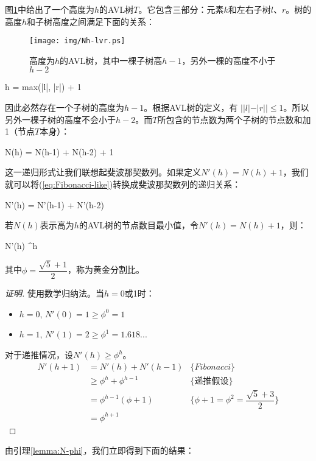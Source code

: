 \documentclass[b5paper]{ctexart}
\begin{document}
图\ref{fig:N-h-relation}中给出了一个高度为$h$的AVL树$T$。它包含三部分：元素$k$和左右子树$l$、$r$。树的高度$h$和子树高度之间满足下面的关系：

\begin{figure}[htbp]
   \centering
   \texttt{[image: img/Nh-lvr.ps]}
   \caption{高度为$h$的AVL树，其中一棵子树高$h - 1$，另外一棵的高度不小于$h - 2$}
   \label{fig:N-h-relation}
\end{figure}

\be
  h = max(|l|, |r|) + 1
\ee

因此必然存在一个子树的高度为$h - 1$。根据AVL树的定义，有 $||l| -|r|| \leq 1$。所以另外一棵子树的高度不会小于$h - 2$。而$T$所包含的节点数为两个子树的节点数和加1（节点$T$本身）：

\be
  N(h) = N(h-1) + N(h-2) + 1
  \label{eq:Fibonacci-like}
\ee

这一递归形式让我们联想起斐波那契数列。如果定义$N'(h) = N(h) + 1$，我们就可以将(\ref{eq:Fibonacci-like})转换成斐波那契数列的递归关系：

\be
  N'(h) = N'(h-1) + N'(h-2)
\ee

\begin{lemma}
\label{lemma:N-phi}
若$N(h)$表示高为$h$的AVL树的节点数目最小值，令$N'(h) = N(h) + 1$，则：

\be
  N'(h) \geq \phi^h
\ee

其中$\phi = \dfrac{\sqrt{5}+1}{2}$，称为黄金分割比。
\end{lemma}

\begin{proof}[证明]
使用数学归纳法。当$h = 0$或1时：
\begin{itemize}
\item $h = 0$, $N'(0) = 1 \geq \phi^0 = 1$
\item $h = 1$, $N'(1) = 2 \geq \phi^1 = 1.618...$
\end{itemize}

对于递推情况，设$N'(h) \geq \phi^h$。
\[
  \begin{array}{lll}
  N'(h+1) & = N'(h) + N'(h-1) & \{Fibonacci\} \\
          & \geq \phi^h + \phi^{h-1} & \{\text{递推假设}\}\\
          & = \phi^{h-1}(\phi + 1) & \{\phi + 1 = \phi^2 = \dfrac{\sqrt{5}+3}{2}\} \\
          & = \phi^{h+1}
 \end{array}
\]
\end{proof}

由引理\ref{lemma:N-phi}，我们立即得到下面的结果：
\end{document}
